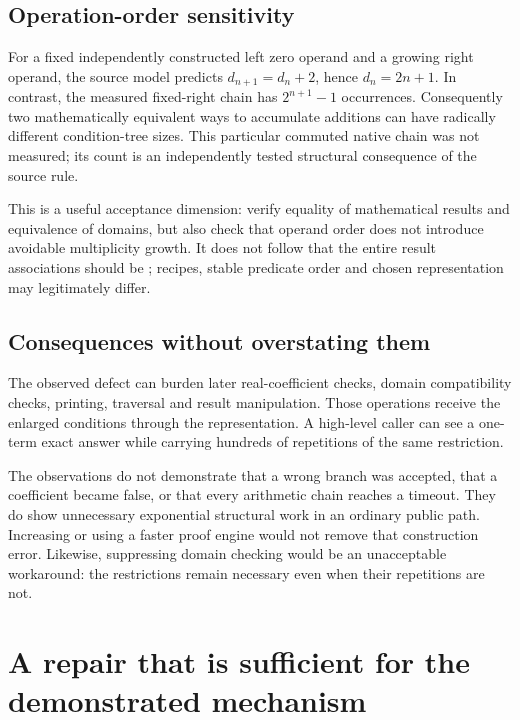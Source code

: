 \documentclass[11pt,a4paper]{article}
\newcommand{\code}[1]{\texttt{\detokenize{#1}}}
\begin{document}
\subsection{Operation-order sensitivity}
For a fixed independently constructed left zero operand and a growing right operand, the source model predicts $d_{n+1}=d_n+2$, hence $d_n=2n+1$. In contrast, the measured fixed-right chain has $2^{n+1}-1$ occurrences. Consequently two mathematically equivalent ways to accumulate additions can have radically different condition-tree sizes. This particular commuted native chain was not measured; its count is an independently tested structural consequence of the source rule.

This is a useful acceptance dimension: verify equality of mathematical results and equivalence of domains, but also check that operand order does not introduce avoidable multiplicity growth. It does not follow that the entire result associations should be \code{SameQ}; recipes, stable predicate order and chosen representation may legitimately differ.

\subsection{Consequences without overstating them}
The observed defect can burden later real-coefficient checks, domain compatibility checks, printing, traversal and result manipulation. Those operations receive the enlarged conditions through the representation. A high-level caller can see a one-term exact answer while carrying hundreds of repetitions of the same restriction.\cite{operations}

The observations do not demonstrate that a wrong branch was accepted, that a coefficient became false, or that every arithmetic chain reaches a timeout. They do show unnecessary exponential structural work in an ordinary public path. Increasing \code{MaxTerms} or using a faster proof engine would not remove that construction error. Likewise, suppressing domain checking would be an unacceptable workaround: the restrictions remain necessary even when their repetitions are not.

\section{A repair that is sufficient for the demonstrated mechanism}
\label{sec:repair}
\end{document}
